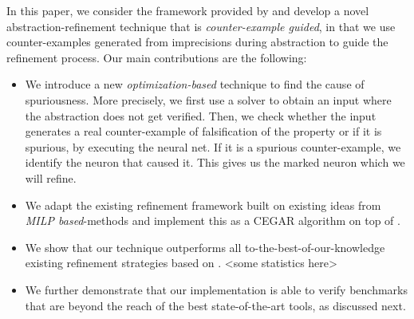 In this paper, we consider the framework provided by \deeppoly{} and develop a novel abstraction-refinement technique that is {\em counter-example guided}, in that we use counter-examples generated from imprecisions during abstraction to guide the refinement process. Our main contributions are the following:
\begin{itemize}
\item We introduce a new {\em optimization-based} technique to find the cause of spuriousness. More precisely, we first use a \milp{} solver to obtain an input where the abstraction does not get verified. Then, we check whether the input generates a real counter-example of falsification of the property or if it is spurious, by executing the neural net. If it is a spurious counter-example, we identify the neuron that caused it.  This gives us the marked neuron which we will refine.
\item We adapt the existing refinement framework built on existing ideas from {\em MILP based}-methods and implement this as a CEGAR algorithm on top of \deeppoly{}.
\item We show that our technique outperforms all to-the-best-of-our-knowledge existing refinement strategies based on \deeppoly{}. <some statistics here>
\item We further demonstrate that our implementation is able to verify benchmarks that are beyond the reach of the best state-of-the-art tools, as discussed next.
\end{itemize}





